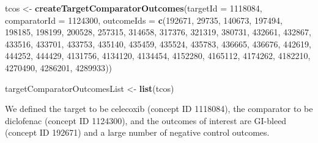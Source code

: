 \documentclass[
]{article}
\newenvironment{Shaded}{\begin{snugshade}}{\end{snugshade}}
\newcommand{\DataTypeTok}[1]{\textcolor[rgb]{0.13,0.29,0.53}{#1}}
\newcommand{\DecValTok}[1]{\textcolor[rgb]{0.00,0.00,0.81}{#1}}
\newcommand{\KeywordTok}[1]{\textcolor[rgb]{0.13,0.29,0.53}{\textbf{#1}}}
\newcommand{\NormalTok}[1]{#1}
\newcommand{\StringTok}[1]{\textcolor[rgb]{0.31,0.60,0.02}{#1}}
\begin{document}
\begin{Shaded}
\begin{Highlighting}[]
\NormalTok{tcos <-}\StringTok{ }\KeywordTok{createTargetComparatorOutcomes}\NormalTok{(}\DataTypeTok{targetId =} \DecValTok{1118084}\NormalTok{,}
                                       \DataTypeTok{comparatorId =} \DecValTok{1124300}\NormalTok{,}
                                       \DataTypeTok{outcomeIds =} \KeywordTok{c}\NormalTok{(}\DecValTok{192671}\NormalTok{, }\DecValTok{29735}\NormalTok{, }\DecValTok{140673}\NormalTok{, }\DecValTok{197494}\NormalTok{, }
                                                      \DecValTok{198185}\NormalTok{, }\DecValTok{198199}\NormalTok{, }\DecValTok{200528}\NormalTok{, }\DecValTok{257315}\NormalTok{, }
                                                      \DecValTok{314658}\NormalTok{, }\DecValTok{317376}\NormalTok{, }\DecValTok{321319}\NormalTok{, }\DecValTok{380731}\NormalTok{, }
                                                      \DecValTok{432661}\NormalTok{, }\DecValTok{432867}\NormalTok{, }\DecValTok{433516}\NormalTok{, }\DecValTok{433701}\NormalTok{, }
                                                      \DecValTok{433753}\NormalTok{, }\DecValTok{435140}\NormalTok{, }\DecValTok{435459}\NormalTok{, }\DecValTok{435524}\NormalTok{, }
                                                      \DecValTok{435783}\NormalTok{, }\DecValTok{436665}\NormalTok{, }\DecValTok{436676}\NormalTok{, }\DecValTok{442619}\NormalTok{, }
                                                      \DecValTok{444252}\NormalTok{, }\DecValTok{444429}\NormalTok{, }\DecValTok{4131756}\NormalTok{, }\DecValTok{4134120}\NormalTok{, }
                                                      \DecValTok{4134454}\NormalTok{, }\DecValTok{4152280}\NormalTok{, }\DecValTok{4165112}\NormalTok{, }\DecValTok{4174262}\NormalTok{, }
                                                      \DecValTok{4182210}\NormalTok{, }\DecValTok{4270490}\NormalTok{, }\DecValTok{4286201}\NormalTok{, }\DecValTok{4289933}\NormalTok{))}

\NormalTok{targetComparatorOutcomesList <-}\StringTok{ }\KeywordTok{list}\NormalTok{(tcos)}
\end{Highlighting}
\end{Shaded}

We defined the target to be celecoxib (concept ID 1118084), the
comparator to be diclofenac (concept ID 1124300), and the outcomes of
interest are GI-bleed (concept ID 192671) and a large number of negative
control outcomes.
\end{document}

